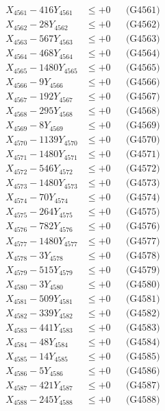 \documentclass[a4paper,10pt]{article}
\begin{document}
{\begin{align}
\allowbreak
X_{4561} - 416Y_{4561} &\leq +0 && \text{(G4561)} \\
X_{4562} - 28Y_{4562} &\leq +0 && \text{(G4562)} \\
X_{4563} - 567Y_{4563} &\leq +0 && \text{(G4563)} \\
X_{4564} - 468Y_{4564} &\leq +0 && \text{(G4564)} \\
X_{4565} - 1480Y_{4565} &\leq +0 && \text{(G4565)} \\
X_{4566} - 9Y_{4566} &\leq +0 && \text{(G4566)} \\
X_{4567} - 192Y_{4567} &\leq +0 && \text{(G4567)} \\
X_{4568} - 295Y_{4568} &\leq +0 && \text{(G4568)} \\
X_{4569} - 8Y_{4569} &\leq +0 && \text{(G4569)} \\
X_{4570} - 1139Y_{4570} &\leq +0 && \text{(G4570)} \\
\allowbreak
X_{4571} - 1480Y_{4571} &\leq +0 && \text{(G4571)} \\
X_{4572} - 546Y_{4572} &\leq +0 && \text{(G4572)} \\
X_{4573} - 1480Y_{4573} &\leq +0 && \text{(G4573)} \\
X_{4574} - 70Y_{4574} &\leq +0 && \text{(G4574)} \\
X_{4575} - 264Y_{4575} &\leq +0 && \text{(G4575)} \\
X_{4576} - 782Y_{4576} &\leq +0 && \text{(G4576)} \\
X_{4577} - 1480Y_{4577} &\leq +0 && \text{(G4577)} \\
X_{4578} - 3Y_{4578} &\leq +0 && \text{(G4578)} \\
X_{4579} - 515Y_{4579} &\leq +0 && \text{(G4579)} \\
X_{4580} - 3Y_{4580} &\leq +0 && \text{(G4580)} \\
\allowbreak
X_{4581} - 509Y_{4581} &\leq +0 && \text{(G4581)} \\
X_{4582} - 339Y_{4582} &\leq +0 && \text{(G4582)} \\
X_{4583} - 441Y_{4583} &\leq +0 && \text{(G4583)} \\
X_{4584} - 48Y_{4584} &\leq +0 && \text{(G4584)} \\
X_{4585} - 14Y_{4585} &\leq +0 && \text{(G4585)} \\
X_{4586} - 5Y_{4586} &\leq +0 && \text{(G4586)} \\
X_{4587} - 421Y_{4587} &\leq +0 && \text{(G4587)} \\
X_{4588} - 245Y_{4588} &\leq +0 && \text{(G4588)} \\

\end{align}}
\end{document}
